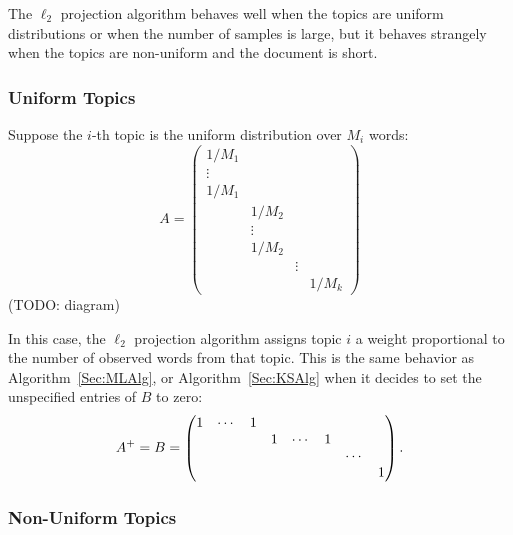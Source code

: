 \documentclass{article}
\begin{document}
The \(\ell_2\) projection algorithm behaves well when the topics are uniform distributions or when the number of samples is large, but it behaves strangely when the topics are non-uniform and the document is short.

\subsubsection{Uniform Topics}

Suppose the \(i\)-th topic is the uniform distribution over \(M_i\) words:
\[
    A =
    \begin{pmatrix}
        1/M_1  &        &        &
    \\  \vdots &        &        &
    \\  1/M_1  &        &        &
    \\         & 1/M_2  &        &
    \\         & \vdots &        &
    \\         & 1/M_2  &        &
    \\         &        & \vdots &
    \\         &        &        & 1/M_k
    \end{pmatrix}
\]
(TODO: diagram)

In this case, the \(\ell_2\) projection algorithm assigns topic \(i\) a weight proportional to the number of observed words from that topic.
This is the same behavior as Algorithm~\ref{Sec:MLAlg}, or Algorithm~\ref{Sec:KSAlg} when it decides to set the unspecified entries of \(B\) to zero:
\[
    A^+ = B =
    \begin{pmatrix}
        1 & \cdots & 1 &   &        &   &        &
    \\    &        &   & 1 & \cdots & 1 &        &
    \\    &        &   &   &        &   & \cdots &
    \\    &        &   &   &        &   &        & 1
    \end{pmatrix}
    \ldotp
\]

\subsubsection{Non-Uniform Topics}
\end{document}

